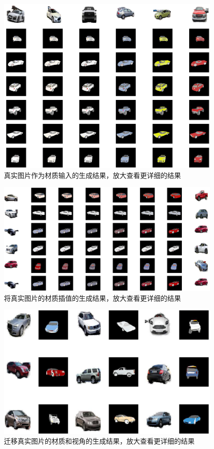 \documentclass[UTF8,openany,AutoFakeBold,AutoFakeSlant,cs4size]{ctexbook}
\begin{document}
\begin{figure}
\centering
\includegraphics[width=\linewidth]{./images/real_swap_thesis.png}
\caption{真实图片作为材质输入的生成结果，放大查看更详细的结果}
\label{result_realimg}
\end{figure}

\begin{figure}
\centering
\includegraphics[width=\linewidth]{./images/real_interpolate_thesis.png}
\caption{将真实图片的材质插值的生成结果，放大查看更详细的结果}
\label{result_realinterpolate}
\end{figure}


\begin{figure}
\centering
\includegraphics[width=0.8\linewidth]{./images/vp_style_transfer_thesis.png}
\caption{迁移真实图片的材质和视角的生成结果，放大查看更详细的结果}
\label{result_stylevp}
\end{figure}
\end{document}
